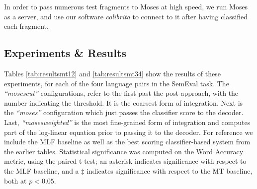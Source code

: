 In order to pass numerous test fragments to Moses at high speed, we run Moses
as a server, and use our software \emph{colibrita} to connect to it after
having classified each fragment.

\subsection{Experiments \& Results}

Tables \ref{tab:resultsmt12} and \ref{tab:resultsmt34} show the results of these experiments, for each of the
four language pairs in the SemEval task. The \emph{``mosescut''} configurations, refer
to the first-past-the-post approach, with the number indicating the threshold.
It is the coarsest form of integration. Next is the \emph{``moses''} configuration
which just passes the classifier score to the decoder. Last, \emph{``mosesweighted''}
is the most fine-grained form of integration and computes part of the
log-linear equation prior to passing it to the decoder. For reference we
 include the MLF baseline as well as the best scoring classifier-based system from the earlier tables.
Statistical significance was computed on the Word Accuracy
metric, using the paired t-test; an asterisk indicates significance with respect to the
MLF baseline, and a $\ddagger$ indicates significance with respect to the MT baseline, both at $p < 0.05$.


